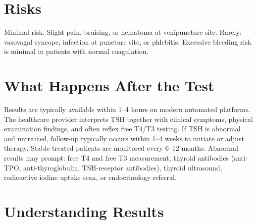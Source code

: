 \section*{Risks}
Minimal risk. Slight pain, bruising, or hematoma at venipuncture site. Rarely: vasovagal syncope, infection at puncture site, or phlebitis. Excessive bleeding risk is minimal in patients with normal coagulation.

\section*{What Happens After the Test}
Results are typically available within 1--4 hours on modern automated platforms. The healthcare provider interprets TSH together with clinical symptoms, physical examination findings, and often reflex free T4/T3 testing. If TSH is abnormal and untreated, follow-up typically occurs within 1--4 weeks to initiate or adjust therapy. Stable treated patients are monitored every 6--12 months. Abnormal results may prompt: free T4 and free T3 measurement, thyroid antibodies (anti-TPO, anti-thyroglobulin, TSH-receptor antibodies), thyroid ultrasound, radioactive iodine uptake scan, or endocrinology referral.

\section*{Understanding Results}

